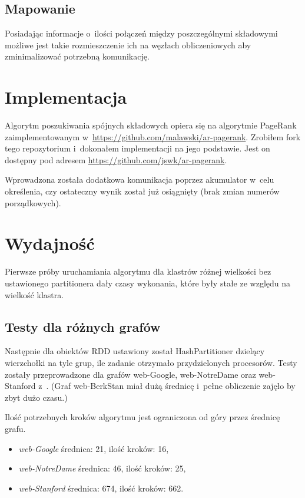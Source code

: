 \documentclass[a4paper; 12pt]{article}
\begin{document}
\subsection{Mapowanie}
Posiadając informacje o~ilości połączeń między poszczególnymi składowymi
możliwe jest takie rozmieszczenie ich na węzłach obliczeniowych aby
zminimalizować potrzebną komunikację.

\section{Implementacja}

Algorytm poszukiwania spójnych składowych \cite{ccpregel} opiera się na
algorytmie PageRank zaimplementowanym
w~\url{https://github.com/malawski/ar-pagerank}.
Zrobiłem fork tego repozytorium i~dokonałem implementacji na jego podstawie.
Jest on dostępny pod adresem \url{https://github.com/jswk/ar-pagerank}.

Wprowadzona została dodatkowa komunikacja poprzez akumulator w~celu określenia,
czy ostateczny wynik został już osiągnięty (brak zmian numerów porządkowych).

\section{Wydajność}

Pierwsze próby uruchamiania algorytmu dla klastrów różnej wielkości bez
ustawionego partitionera dały czasy wykonania, które były stałe ze względu na
wielkość klastra.

\subsection{Testy dla różnych grafów \label{sec:tests1}}

Następnie dla obiektów RDD ustawiony został HashPartitioner dzielący
wierzchołki na tyle grup, ile zadanie otrzymało przydzielonych procesorów.
Testy zostały przeprowadzone dla grafów web-Google, web-NotreDame oraz
web-Stanford z~\cite{realgraphs}.
(Graf web-BerkStan miał dużą średnicę i~pełne obliczenie zajęło by zbyt dużo czasu.)

Ilość potrzebnych kroków algorytmu jest ograniczona od góry przez średnicę grafu.
\begin{itemize}
    \item \emph{web-Google} średnica: 21, ilość kroków: 16,
    \item \emph{web-NotreDame} średnica: 46, ilość kroków: 25,
    \item \emph{web-Stanford} średnica: 674, ilość kroków: 662.
\end{itemize}
\end{document}
